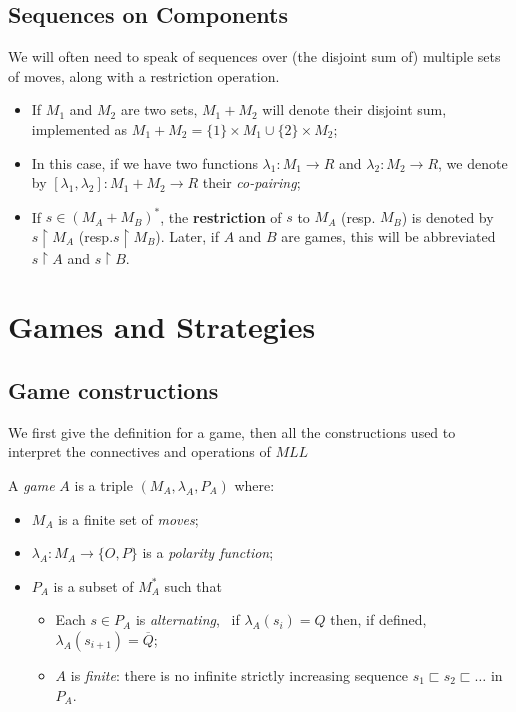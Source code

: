 \subsection{Sequences on Components}\label{sequences-on-components}

We will often need to speak of sequences over (the disjoint sum of)
multiple sets of moves, along with a restriction operation.

\begin{itemize}
\item If \(M_1\) and \(M_2\) are two sets, \(M_1 + M_2\) will denote their
  disjoint sum, implemented as
  \(M_1 + M_2 = \{1\}\times M_1 \cup \{2\}\times M_2\);
\item In this case, if we have two functions \(\lambda_1:M_1 \to R\) and
  \(\lambda_2:M_2\to R\), we denote by
  \([\lambda_1,\lambda_2]:M_1 + M_2 \to R\) their \emph{co-pairing};
\item If \(s\in (M_A + M_B)^*\), the \textbf{restriction} of \(s\) to
  \(M_A\) (resp. \(M_B\)) is denoted by \(s\upharpoonright M_A\)
  (resp.\(s \upharpoonright M_B\)). Later, if \(A\) and \(B\) are games,
  this will be abbreviated \(s\upharpoonright A\) and
  \(s\upharpoonright B\).
\end{itemize}

\section{Games and Strategies}\label{games-and-strategies}

\subsection{Game constructions}\label{game-constructions}

We first give the definition for a game, then all the constructions used
to interpret the connectives and operations of \(MLL\)

\begin{definition}[Games]
A \emph{game} $ A$ is a triple $(M_A,\lambda_A,P_A)$ where:
\begin{itemize}
\item $M_A$ is a finite set of \emph{moves};
\item $\lambda_A: M_A \to \{O,P\}$ is a \emph{polarity function};
\item $P_A$ is a subset of $M_A^*$ such that
  \begin{itemize}
  \item Each $s\in P_A$ is \emph{alternating}, \ie\ if $\lambda_A (s_i) = Q$ then, if defined, $\lambda_A(s_{i+1}) = \overline{Q}$;
  \item $A$ is \emph{finite}: there is no infinite strictly increasing sequence $s_1 \sqsubset s_2 \sqsubset \dots $ in $P_A$.
  \end{itemize}
\end{itemize}
\end{definition}


